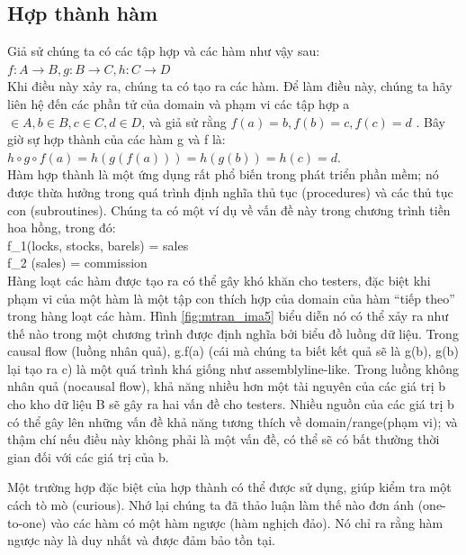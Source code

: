 \documentclass[11pt,a4paper,oneside]{article}
\begin{document}
\subsection {Hợp thành hàm}
Giả sử chúng ta có các tập hợp và các hàm như vậy sau:\\
$f : A \to B, g : B \to C, h : C \to D$\\
Khi điều này xảy ra, chúng ta có tạo ra các hàm. Để làm điều này, chúng ta hãy liên hệ đến các phần tử của domain và phạm vi các tập hợp a $ \in A, b \in B, c \in C, d \in D $, và giả sử rằng $ f\left(a\right) = b, f\left(b\right) = c, f\left(c\right) = d$ . Bây giờ sự hợp thành của các hàm g và f  là: \\
$h \circ g \circ f\left(a\right) = h\left(g\left(f\left(a\right)\right)\right) = h\left(g\left(b\right)\right) = h\left(c\right) = d.$\\
\newline
Hàm hợp thành là một ứng dụng rất phổ biến trong phát triển phần mềm; nó được thừa hưởng trong quá trình định nghĩa thủ tục (procedures) và các thủ tục con (subroutines). Chúng ta có một ví dụ về vấn đề này trong chương trình tiền hoa hồng, trong đó:\\
f_{1}\left(locks, stocks, barels\right) = sales\\
f_{2} \left(sales\right) = commission\\

Hàng loạt các hàm được tạo ra có thể gây khó khăn cho testers, đặc biệt khi phạm vi của một hàm là một tập con thích hợp của domain của hàm “tiếp theo” trong hàng loạt các hàm. Hình \ref{fig:mtran_ima5} biểu diễn nó có thể xảy ra như thế nào trong một chương trình được định nghĩa bởi biểu đồ luồng dữ liệu.
Trong causal flow (luồng nhân quả), g.f(a) (cái mà chúng ta biết kết quả sẽ là g(b), g(b) lại tạo ra c) là một quá trình khá giống như assemblyline-like. Trong luồng không nhân quả (nocausal flow), khả năng nhiều hơn một tài nguyên của các giá trị b cho kho dữ liệu B sẽ gây ra hai vấn đề cho testers. Nhiều nguồn của các giá trị b có thể gây lên những vấn đề khả năng tương thích về domain/range(phạm vi); và thậm chí nếu điều này không phải là một vấn đề, có thể sẽ có bất thường thời gian đối với các giá trị của b. 

Một trường hợp đặc biệt của hợp thành có thể được sử dụng, giúp kiểm tra một cách tò mò (curious). Nhớ lại chúng ta đã thảo luận làm thế nào đơn ánh (one-to-one) vào các hàm có một hàm ngược (hàm nghịch đảo). Nó chỉ ra rằng hàm ngược này là duy nhất và được đảm bảo tồn tại. 
\end{document}
